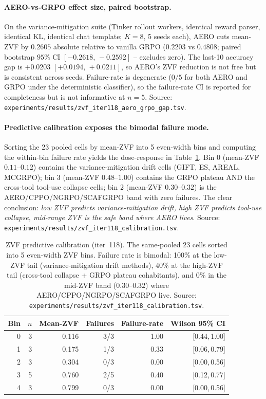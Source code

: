 \paragraph{AERO-vs-GRPO effect size, paired bootstrap.}
On the variance-mitigation suite (Tinker rollout workers, identical
reward parser, identical KL, identical chat template; $K{=}8$, 5 seeds
each), AERO cuts mean-ZVF by $0.2605$ absolute relative to vanilla
GRPO ($0.2203$ vs $0.4808$; paired bootstrap $95\%$ CI
$[-0.2618,\,-0.2592]$ -- excludes zero). The last-10 accuracy gap is
$+0.0203$ $[+0.0194,\,+0.0211]$, so AERO's ZVF reduction is not free
but is consistent across seeds. Failure-rate is degenerate ($0/5$ for
both AERO and GRPO under the deterministic classifier), so the
failure-rate CI is reported for completeness but is not informative at
$n{=}5$. Source:
\texttt{experiments/results/zvf\_iter118\_aero\_grpo\_gap.tsv}.

\paragraph{Predictive calibration exposes the bimodal failure mode.}
Sorting the 23 pooled cells by mean-ZVF into 5 even-width bins and
computing the within-bin failure rate yields the dose-response in
Table~\ref{tab:zvf-iter118-calib}. Bin 0 (mean-ZVF $0.11$--$0.12$)
contains the variance-mitigation drift cells (GIFT, ES, AREAL,
MCGRPO); bin 3 (mean-ZVF $0.48$--$1.00$) contains the GRPO plateau
AND the cross-tool tool-use collapse cells; bin 2
(mean-ZVF $0.30$--$0.32$) is the AERO/CPPO/NGRPO/SCAFGRPO band with
zero failures. The clear conclusion: \emph{low ZVF predicts
variance-mitigation drift, high ZVF predicts tool-use collapse,
mid-range ZVF is the safe band where AERO lives}. Source:
\texttt{experiments/results/zvf\_iter118\_calibration.tsv}.

\begin{table}[htbp]
\centering\small
\setlength{\tabcolsep}{4pt}
\begin{tabular}{rrrrrr}
\hline
Bin & $n$ & Mean-ZVF & Failures & Failure-rate & Wilson 95\% CI \\
\hline
0 & 3 & 0.116 & 3/3 & 1.00 & [0.44,\,1.00] \\
1 & 3 & 0.175 & 1/3 & 0.33 & [0.06,\,0.79] \\
2 & 3 & 0.304 & 0/3 & 0.00 & [0.00,\,0.56] \\
3 & 5 & 0.760 & 2/5 & 0.40 & [0.12,\,0.77] \\
4 & 3 & 0.799 & 0/3 & 0.00 & [0.00,\,0.56] \\
\hline
\end{tabular}
\caption{ZVF predictive calibration (iter~118). The same-pooled
23 cells sorted into 5 even-width ZVF bins. Failure rate is
bimodal: 100\% at the low-ZVF tail (variance-mitigation drift
methods), 40\% at the high-ZVF tail (cross-tool collapse +
GRPO plateau cohabitants), and 0\% in the mid-ZVF band
($0.30$--$0.32$) where AERO/CPPO/NGRPO/SCAFGRPO live. Source:
\texttt{experiments/results/zvf\_iter118\_calibration.tsv}.}
\label{tab:zvf-iter118-calib}
\end{table}

